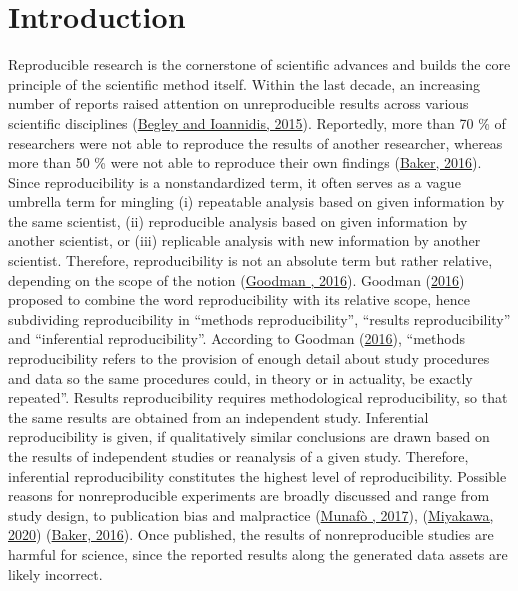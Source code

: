 \documentclass[letterpaper,12pt,english]{jupyterBook}
\begin{document}
\sphinxstepscope

\pagestyle{normal}
\chapter{Introduction}
\label{\detokenize{introduction:introduction}}\label{\detokenize{introduction::doc}}
\sphinxAtStartPar
Reproducible research is the cornerstone of scientific advances and builds the core principle of the scientific method itself. Within the last decade, an increasing number of reports raised attention on unreproducible results across various scientific disciplines (\hyperlink{cite.references:id33}{Begley and Ioannidis, 2015}). Reportedly, more than 70 \% of researchers were not able to reproduce the results of another researcher, whereas more than 50 \% were not able to reproduce their own findings (\hyperlink{cite.references:id32}{Baker, 2016}).
Since reproducibility is a non\sphinxhyphen{}standardized term, it often serves as a vague umbrella term for mingling (i) repeatable analysis based on given information by the same scientist, (ii) reproducible analysis based on given information by another scientist, or (iii) replicable analysis with new information by another scientist.
Therefore, reproducibility is not an absolute term but rather relative, depending on the scope of the notion (\hyperlink{cite.references:id31}{Goodman , 2016}). Goodman  (\hyperlink{cite.references:id31}{2016}) proposed to combine the word reproducibility with its relative scope, hence subdividing reproducibility in “methods reproducibility”, “results reproducibility” and “inferential reproducibility”. According to Goodman  (\hyperlink{cite.references:id31}{2016}), “methods reproducibility refers to the provision of enough detail about study procedures and data so the same procedures could, in theory or in actuality, be exactly repeated”. Results reproducibility requires methodological reproducibility, so that the same results are obtained from an independent study. Inferential reproducibility is given, if qualitatively similar conclusions are drawn based on the results of independent studies or reanalysis of a given study. Therefore, inferential reproducibility constitutes the highest level of reproducibility. Possible reasons for non\sphinxhyphen{}reproducible experiments are broadly discussed and range from study design, to publication bias and malpractice (\hyperlink{cite.references:id34}{Munafò , 2017}), (\hyperlink{cite.references:id21}{Miyakawa, 2020}) (\hyperlink{cite.references:id32}{Baker, 2016}). Once published, the results of non\sphinxhyphen{}reproducible studies are harmful for science, since the reported results along the generated data assets are likely incorrect.
\end{document}
